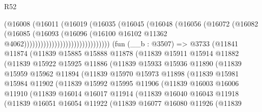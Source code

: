 \begin{lexlean}{R52}
\begin{coremodule}
                                        (@16008
                                          (@16011
                                            (@16019
                                              (@16035
                                                (@16045
                                                  (@16048
                                                    (@16056
                                                      (@16072
                                                        (@16082
                                                          (@16085
                                                            (@16093
                                                              (@16096
                                                                (@16100
                                                                  @16102
                                                                  @11362
                                                                  @4062)))))))))))))))))))))))))))))))
    (fun (__b : @3507) =>
    @3733
      (@11841
        @11874
        (@11839
          @15885
          @15888
          @11878
          (@11839
            @15911
            @15914
            @11882
            (@11839
              @15922
              @15925
              @11886
              (@11839
                @15933
                @15936
                @11890
                (@11839
                  @15959
                  @15962
                  @11894
                  (@11839
                    @15970
                    @15973
                    @11898
                    (@11839
                      @15981
                      @15984
                      @11902
                      (@11839
                        @15992
                        @15995
                        @11906
                        (@11839
                          @16003
                          @16006
                          @11910
                          (@11839
                            @16014
                            @16017
                            @11914
                            (@11839
                              @16040
                              @16043
                              @11918
                              (@11839
                                @16051
                                @16054
                                @11922
                                (@11839
                                  @16077
                                  @16080
                                  @11926
                                  (@11839

\end{coremodule}
\end{lexlean}
